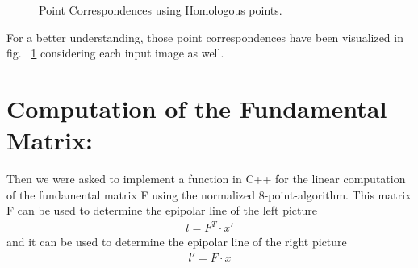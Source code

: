 \documentclass[a4paper,headings=small]{scrartcl}
\numberwithin{equation}{section} %
\numberwithin{figure}{section}   %
\newcommand{\generatedImgRootTarget}{../../../target}
\begin{document}
\begin{figure}
   \hfill
   \hfill
  \caption{Point Correspondences using Homologous points.}
  \label{fig:Point Correspondences}
\end{figure}

For a better understanding, those point correspondences have been 
visualized in fig. ~\ref{fig:Point Correspondences}
considering each input image as well.

\section{Computation of the Fundamental Matrix:}

Then we were asked to implement a function in C++ for the linear computation of the fundamental
matrix F using the normalized 8-point-algorithm.
This matrix F can be used to determine the epipolar line of the left picture
   \begin{align}
       l = F^T \cdot x'
   \end{align}
and it can be used to determine the epipolar line of the right picture
   \begin{align}
       l' = F \cdot x
   \end{align}
\end{document}
